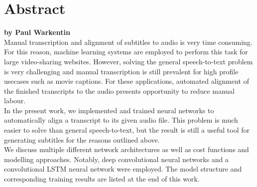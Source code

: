 \chapter*{Abstract}

\textbf{by Paul Warkentin} \\

Manual transcription and alignment of subtitles to audio is very time consuming. For this reason, machine learning systems are employed to perform this task for large video-sharing websites. However, solving the general speech-to-text problem is very challenging and manual transcription is still prevalent for high profile usecases such as movie captions. For these applications, automated alignment of the finished transcripts to the audio presents opportunity to reduce manual labour.\\

In the present work, we implemented and trained neural networks to automatically align a transcript to its given audio file. This problem is much easier to solve than general speech-to-text, but the result is still a useful tool for generating subtitles for the reasons outlined above. \\

We discuss multiple different network architectures as well as cost functions and modelling approaches. Notably, deep convolutional neural networks and a convolutional LSTM neural network were employed. The model structure and corresponding training results are listed at the end of this work.

